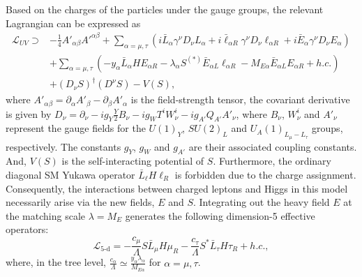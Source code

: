 \documentclass[onecolumn, aps, nofootinbib, prd, preprint, floats, floatfix, amsmath, amssymb, superscriptaddress, preprintnumbers]{revtex4-1}
\begin{document}
Based on the charges of the particles under the gauge groups, the relevant Lagrangian can be expressed as
\begin{equation}\label{eq:Lagrangian}
\begin{aligned}
\mathcal{L}_{UV}\supset& -\frac{1}{4}A'_{\alpha\beta}A'^{\alpha\beta}+\sum_{\alpha=\mu,\tau}\left(i\bar{L}_\alpha \gamma^\nu D_{\nu} L_\alpha + i\bar{\ell}_{\alpha R} \gamma^\nu D_{\nu}\ell_{\alpha R} + i\bar{E}_{\alpha}\gamma^\nu D_{\nu} E_{\alpha}\right)  \\
&+\sum_{\alpha=\mu,\tau}\left(-y_\alpha \bar L_\alpha H E_{\alpha R} -\lambda_\alpha S^{(*)}\bar E_{\alpha L}\ell_{\alpha R} -M_{E\alpha}\bar E_{\alpha L}E_{\alpha R} + h.c.\right)\\
&+ (D_{\nu}S)^\dagger (D^{\nu}S) - V(S),
\end{aligned}
\end{equation}
where $A'_{\alpha\beta}=\partial_\alpha A'_\beta - \partial_\beta A'_\alpha$ is the field-strength tensor, the covariant derivative is given by $D_\nu = \partial_\nu -ig_Y \frac{Y}{2}B_\nu  -ig_W T^iW_\nu^i - ig_{A'} Q_{A'} A'_\nu$, where $B_\nu$, $W_\nu^i$ and $A'_\nu$ represent the gauge fields for the ${U(1)}_Y$, ${SU(2)}_L$ and ${U_A(1)}_{L_\mu-L_\tau}$ groups, respectively. The constants $g_Y$, $g_W$ and $g_{A'}$ are their associated coupling constants. And, $V(S)$ is the self-interacting potential of $S$. Furthermore, the ordinary diagonal SM Yukawa operator $\bar L_\ell H\ell_R$ is forbidden due to the charge assignment. Consequently, the interactions between charged leptons and Higgs in this model necessarily arise via the new fields, $E$ and $S$. Integrating out the heavy field $E$ at the matching scale $\lambda=M_E$ generates the following dimension-5 effective operators:
\begin{equation}\label{eq:5-d}
    \mathcal{L}_{\text{5-d}} =
    -\frac{c_\mu}{\Lambda} S \bar{L}_\mu H\mu_R
    -\frac{c_\tau}{\Lambda} S^* \bar{L}_\tau H\tau_R
    +h.c.,
\end{equation}
where, in the tree level, $\frac{c_\alpha}{\Lambda}\simeq \frac{y_\alpha \lambda_\alpha}{M_{E\alpha }}$ for $\alpha=\mu,\tau$.
\end{document}

